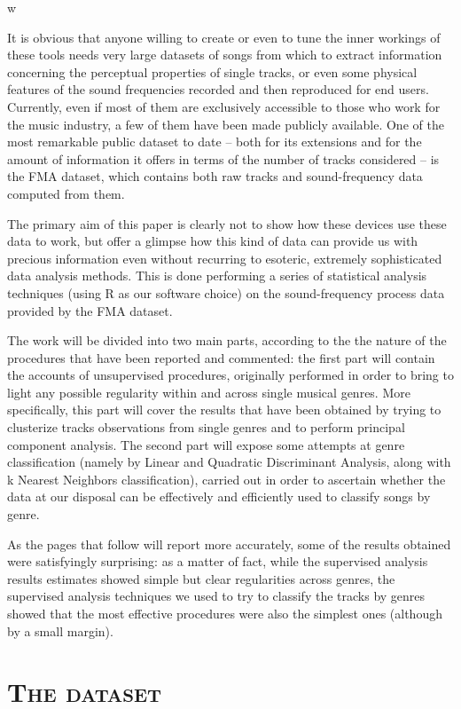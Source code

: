 w\documentclass[11pt, oneside]{article}
\begin{document}
It is obvious that anyone willing to create or even to tune the inner workings of these tools needs very large datasets of songs from which to extract information concerning the perceptual properties of single tracks, or even some physical features of the sound frequencies recorded and then reproduced for end users. Currently, even if most of them are exclusively accessible to those who work for the music industry, a few of them have been made publicly available. One of the most remarkable public dataset to date -- both for its extensions and for the amount of information it offers in terms of the number of tracks considered -- is the FMA dataset, which contains both raw tracks and sound-frequency data computed from them.

The primary aim of this paper is clearly not to show how these devices use these data to work, but offer a glimpse how this kind of data can provide us with precious information even without recurring to esoteric, extremely sophisticated data analysis methods. This is done performing a series of statistical analysis techniques (using R as our software choice) on the sound-frequency process data provided by the FMA dataset.


The work will be divided into two main parts, according to the the nature of the procedures that have been reported and commented: the first part will contain the accounts of unsupervised procedures, originally performed in order to bring to light any possible regularity within and across single musical genres. More specifically, this part will cover the results that have been obtained by trying to clusterize tracks observations from single genres and to perform principal component analysis. The second part will expose some attempts at genre classification (namely by Linear and Quadratic Discriminant Analysis, along with k Nearest Neighbors classification), carried out in order to ascertain whether the data at our disposal can be effectively and efficiently used to classify songs by genre.

As the pages that follow will report more accurately, some of the results obtained were satisfyingly surprising: as a matter of fact, while the supervised analysis results estimates showed simple but clear regularities across genres, the supervised analysis techniques we used to try to classify the tracks by genres showed that the most effective procedures were also the simplest ones (although by a small margin).

\newpage

\section[The dataset]{\textsc{The dataset}}
\end{document}
